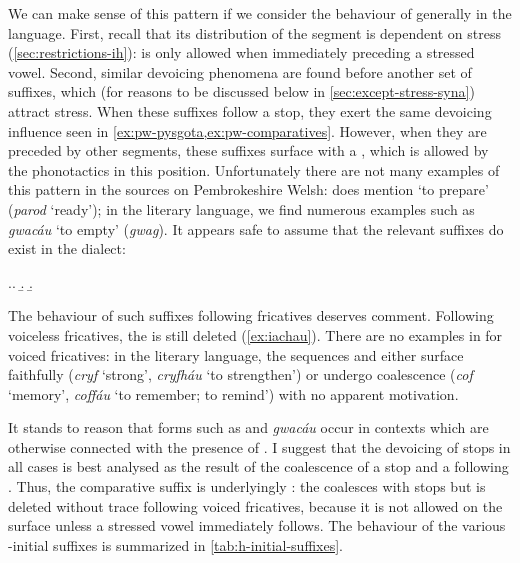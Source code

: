 We can make sense of this pattern if we consider the behaviour of \ipa{[h]} generally in the language. First, recall that its distribution of the segment \ipa{[h]} is dependent on stress (\cref{sec:restrictions-ih}): \ipa{[h]} is only allowed when immediately preceding a stressed vowel. Second, similar devoicing phenomena are found before another set of suffixes, which (for reasons to be discussed below in \cref{sec:except-stress-syna}) attract stress. When these suffixes follow a stop, they exert the same devoicing influence seen in \cref{ex:pw-pysgota,ex:pw-comparatives}. However, when they are preceded by other segments, these suffixes surface with a \ipa{[h]}, which is allowed by the phonotactics in this position. Unfortunately there are not many examples of this pattern in the sources on Pembrokeshire Welsh: \citet{welshphonotactics} does mention \ipa{[paraˈtoi]} `to prepare' (\emph{parod} `ready'); in the literary language, we find numerous examples such as \emph{gwacáu} `to empty' (\emph{gwag}). It appears safe to assume that the relevant suffixes do exist in the dialect:

\ex.\a.\label{ex:iachau}\hfill \citep[p.~156]{awbery86:_pembr_welsh}
\b.\hfill \citep[\emph{sub voce}]{thomas00:_welsh}
\b.\hfill \citep[\emph{sub voce}]{thomas00:_welsh}

The behaviour of such suffixes following fricatives deserves comment. Following voiceless fricatives, the \ipa{[h]} is still deleted (\cref{ex:iachau}).
There are no examples in \citet{awbery86:_pembr_welsh} for voiced fricatives: in the literary language, the sequences  and  either surface faithfully (\emph{cryf} `strong', \emph{cryfháu} `to strengthen') or undergo coalescence (\emph{cof} `memory', \emph{coffáu} `to remember; to remind') with no apparent motivation.

It stands to reason that forms such as \ipa{[paraˈtoi]} and \emph{gwacáu} occur in contexts which are otherwise connected with the presence of \ipa{[h]}. I suggest that the devoicing of stops in all cases is best analysed as the result of the coalescence of a stop and a following \ipa{[h]}. Thus, the comparative suffix is  underlyingly : the \ipa{[h]} coalesces with stops but is deleted without trace following voiced fricatives, because it is not allowed on the surface unless a stressed vowel immediately follows. The behaviour of the various -initial suffixes is summarized in \cref{tab:h-initial-suffixes}.

